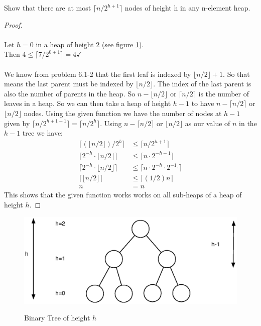 \documentclass[12pt]{article}
\newenvironment{problem}[2][Problem]{\begin{trivlist}
\item[\hskip \labelsep {\bfseries #1}\hskip \labelsep {\bfseries #2.}]}{\end{trivlist}}
\begin{document}
\begin{problem}{6.3-3} Show that there are at most $\lceil n/2^{h+1} \rceil$ nodes of height h in any n-element heap. \\
  \begin{proof}\ \\

   \\

  \indent Let $h = 0$ in a heap of height $2$ (see figure \ref{fig:bintree2}). \\
  \indent Then $4 \le \lceil 7/2^{0+1} \rceil = 4 \checkmark$ \\

   \\

  We know from problem 6.1-2 that the first leaf is indexed by $\lfloor n/2 \rfloor + 1$. So that means the last parent must
  be indexed by $\lfloor n/2 \rfloor$. The index of the last parent is also the number of parents in the heap. So
  $n - \lfloor n/2 \rfloor$ or $\lceil n/2 \rceil$ is the number of leaves in a heap. So we can then take a heap of height $h - 1$
  to have $n - \lceil n/2 \rceil$ or $\lfloor n/2 \rfloor$ nodes. Using the given function we have the number of nodes at $h - 1$
  given by $\lceil n/2^{h+1-1} \rceil = \lceil n/2^{h} \rceil$. Using $n - \lceil n/2 \rceil$ or $\lfloor n/2 \rfloor$ as our
  value of $n$ in the $h - 1$ tree we have:
  \begin{align*}
    \lceil (\lfloor n/2 \rfloor)/2^{h} \rceil &\le \lceil n/2^{h+1} \rceil \\
    \lceil 2^{-h} \cdot \lfloor n/2 \rfloor \rceil &\le  \lceil n \cdot 2^{-h-1} \rceil \\
    \lceil 2^{-h} \cdot \lfloor n/2 \rfloor \rceil &\le  \lceil n \cdot 2^{-h}\cdot 2^{-1} \cdot \rceil \\
    \lceil \lfloor n/2 \rfloor \rceil &\le  \lceil (1/2)n\rceil \\
    n &= n
  \end{align*}
  This shows that the given function works works on all sub-heaps of a heap of height $h$.
  \end{proof}
  \begin{figure}[!h]
    \centering
    \caption{Binary Tree of height $h$}
    \includegraphics[scale=.75]{bin_tree2.eps}
    \label{fig:bintree2}
  \end{figure}
\end{problem}

\end{document}
